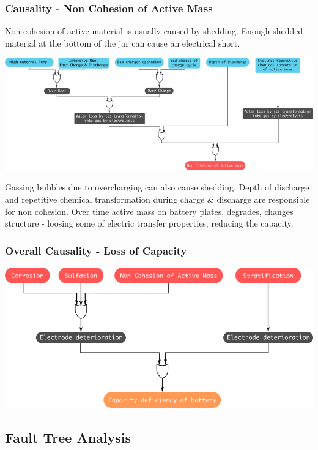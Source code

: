 \documentclass{beamer}
\begin{document}
\begin{frame}     %
  \frametitle{Causality - Non Cohesion of Active Mass}
  \fontsize{8pt}{12}\selectfont
  \vspace{-20pt}
  Non cohesion of active material is usually caused by shedding. Enough shedded material at the bottom of the jar can cause an electrical short. 

  \begin{center}
    \includegraphics[width=\linewidth]{./Resources/Images/analysis_causality_lossofactivemass.png}
  \end{center}
  \vspace{-8pt}
  Gassing bubbles due to overcharging can also cause shedding. Depth of discharge and repetitive chemical transformation during charge \& discharge are responsible for non cohesion.
  Over time active mass on battery plates, degrades, changes structure - loosing some of electric transfer properties, reducing the capacity.
\end{frame}

\begin{frame}     %
  \frametitle{Overall Causality - Loss of Capacity}
  \begin{center}
    \includegraphics[width=\linewidth]{./Resources/Images/analysis_causality_overall.png}
  \end{center}
\end{frame}


\subsection{Fault Tree Analysis}          %
\end{document}
